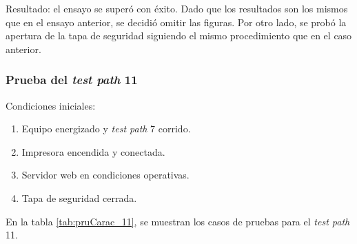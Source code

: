 Resultado: el ensayo se superó con éxito. Dado que los resultados son los mismos que en el ensayo anterior, se decidió omitir las figuras. Por otro lado, se probó la apertura de la tapa de seguridad siguiendo el mismo procedimiento que en el caso anterior.

\pagebreak

\subsubsection{Prueba del \textit{test path} 11}
\label{subsubsec:pruCarac_11}

Condiciones iniciales: 

\begin{enumerate}
	\item Equipo energizado y \textit{test path} 7 corrido.
	\item Impresora encendida y conectada.
	\item Servidor web en condiciones operativas.
	\item Tapa de seguridad cerrada.
\end{enumerate}

En la tabla \ref{tab:pruCarac_11}, se muestran los casos de pruebas para el \textit{test path} 11.

